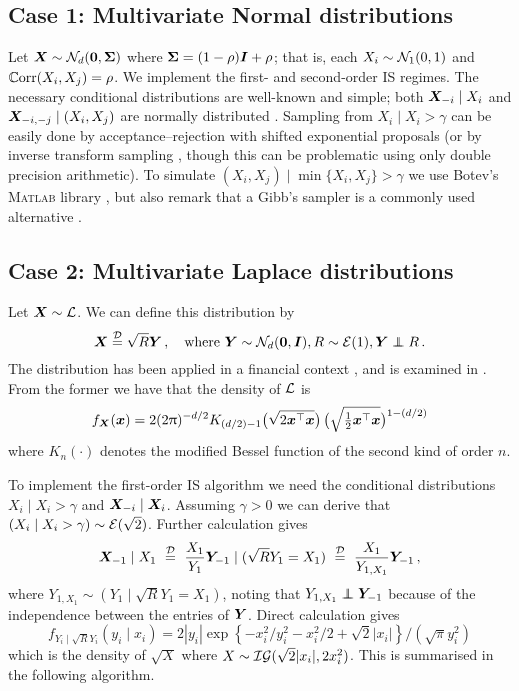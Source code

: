 \subsection*{Case 1: Multivariate Normal distributions}

Let $\bm{X} \sim \mathcal{N}_d(\bm{0}, \bm{\Sigma})$ where $\bm{\Sigma} = (1-\rho) \bm{I} + \rho$; that is, each $X_i \sim \mathcal{N}_1(0,1)$ and $\mathbb{C}\mathrm{orr}(X_i,X_j)=\rho$. We implement the first- and second-order IS regimes. The necessary conditional distributions are well-known and simple; both $\bm{X}_{-i} \mid X_i$ and $\bm{X}_{-i,-j} \mid (X_i, X_j)$ are normally distributed \cite{anderson1962introduction}.
Sampling from $X_i \mid X_i > \gamma$ can be easily done by acceptance--rejection with shifted exponential proposals \cite{robert1995simulation} (or by inverse transform sampling \cite[Remark 2.4]{asmussen2007stochastic}, though this can be problematic using only double precision arithmetic). To simulate $(X_i,X_j) \mid \min\{X_i, X_j\}>\gamma$ we use Botev's \textsc{Matlab} library \cite{botev2017normal}, but also remark that a Gibb's sampler is a commonly used alternative \cite{breslaw1994random,robert1995simulation}.


\subsection*{Case 2: Multivariate Laplace distributions} \label{scn:laplace}

Let $\bm{X} \sim \mathcal{L}$. We can define this distribution by
\[ \bfX \eqdistr \sqrt{R} \bfY \,, \quad \text{where } \bfY \sim \NormDist_d(\bfzero,\bfI), R \sim \ExpDist(1), \bfY \independent R \,.
\]
The distribution has been applied in a financial context \cite{huang2003rare}, and is examined in
\cite{eltoft2006multivariate,kotz2001asymmetric}. From the former we have that the density of $\mathcal{L}$ is
\[
f_{\bm{X}}(\bm{x}) = 2 (2 \uppi)^{-d/2}  K_{(d/2) -1} \big( \sqrt{2 \bm{x}^\top \bm{x}} \big) \,
 \big(\sqrt{\tfrac{1}{2} \bm{x}^\top \bm{x}}\big)^{1-(d/2)}
\]
where $K_n(\cdot)$ denotes the modified Bessel function of the second kind of order $n$. 

To implement the first-order IS algorithm we need the conditional distributions $X_i \mid X_i > \gamma$ and
$\bm{X}_{-i} \mid \bm{X}_i$.
Assuming $\gamma > 0$ we can derive that $(X_i \mid X_i > \gamma) \sim \mathcal{E}(\sqrt{2})$.
Further calculation gives
\[
\bm{X}_{-1} \mid X_1 \ \stackrel{{\scriptstyle \mathcal{D}}}{=}\ \frac{X_1}{Y_1} \bm{Y}_{-1} \mid (\sqrt{R} Y_1 = X_1) \ \stackrel{{\scriptstyle \mathcal{D}}}{=}\
\frac{X_1}{Y_{1,X_1}} \bm{Y}_{-1} \,,
\]
where $Y_{1,X_1} \sim (Y_1 \mid \sqrt{R} Y_1 = X_1)$, noting that $Y_{1,X_1} \independent \bfY_{-1}$ because of the independence between the entries of $\bm{Y}$. Direct calculation gives 
\[
f_{Y_i \mid \sqrt{R} Y_i}(y_i \mid x_i) = 
 2 \left| y_i\right|  \exp\left\{
   -x_i^2 / y_i^2 - x_i^2 / 2 + \sqrt{2} \left| x_i\right| \right\} / (\sqrt{\pi } y_i^2)
\]
which is the density of $\sqrt{X}$ where 
$X \sim \mathcal{IG}(\sqrt{2} |x_i|, 2 x_i^2)$.
This is summarised in the following algorithm.

